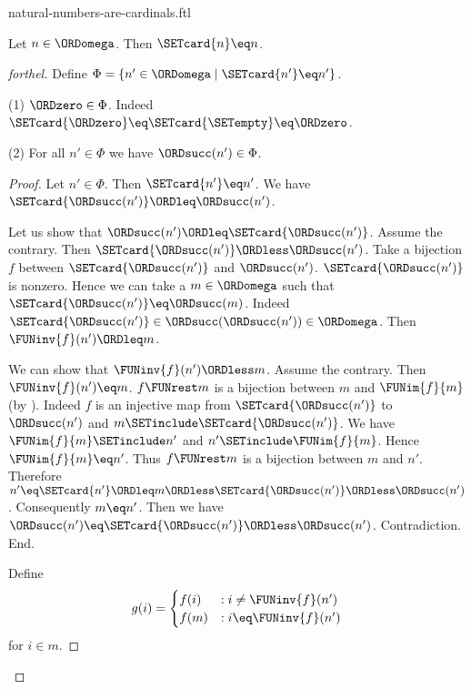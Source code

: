 \documentclass{naproche-library}
\begin{document}
\begin{smodule}[title=Natural Numbers are Cardinal Numbers]{natural-numbers-are-cardinals.ftl}

\begin{theorem}[forthel,id=SET_THEORY_07_2948332552978432]
  Let $n \in \ORDomega$.
  Then $\SETcard{n} \eq n$.
\end{theorem}
\begin{proof}[forthel]
  Define $\Phi = \{ n' \in \ORDomega \mid \SETcard{n'} \eq n' \}$.

  (1) $\ORDzero \in \Phi$.
  Indeed $\SETcard{\ORDzero} \eq \SETcard{\SETempty} \eq \ORDzero$.

  (2) For all $n' \in \Phi$ we have $\ORDsucc(n') \in \Phi$.
  \begin{proof}
    Let $n' \in \Phi$.
    Then $\SETcard{n'} \eq n'$.
    We have $\SETcard{\ORDsucc(n')} \ORDleq \ORDsucc(n')$.

    Let us show that $\ORDsucc(n') \ORDleq \SETcard{\ORDsucc(n')}$.
      Assume the contrary.
      Then $\SETcard{\ORDsucc(n')} \ORDless \ORDsucc(n')$.
      Take a bijection $f$ between $\SETcard{\ORDsucc(n')}$ and $\ORDsucc(n')$.
      $\SETcard{\ORDsucc(n')}$ is nonzero.
      Hence we can take a $m \in \ORDomega$ such that $\SETcard{\ORDsucc(n')} \eq \ORDsucc(m)$.
      Indeed $\SETcard{\ORDsucc(n')} \in \ORDsucc(\ORDsucc(n')) \in \ORDomega$.
      Then $\FUNinv{f}(n') \ORDleq m$.

      We can show that $\FUNinv{f}(n') \ORDless m$.
        Assume the contrary.
        Then $\FUNinv{f}(n') \eq m$.
        $f \FUNrest m$ is a bijection between $m$ and $\FUNim{f}{m}$ (by ).
        Indeed $f$ is an injective map from $\SETcard{\ORDsucc(n')}$ to $\ORDsucc(n')$ and
        $m \SETinclude \SETcard{\ORDsucc(n')}$.
        We have $\FUNim{f}{m} \SETinclude n'$ and $n' \SETinclude \FUNim{f}{m}$.
        Hence $\FUNim{f}{m} \eq n'$.
        Thus $f \FUNrest m$ is a bijection between $m$ and $n'$.
        Therefore $n'
          \eq \SETcard{n'}
          \ORDleq m
          \ORDless \SETcard{\ORDsucc(n')}
          \ORDless \ORDsucc(n')$.
        Consequently $m \eq n'$.
        Then we have $\ORDsucc(n') \eq \SETcard{\ORDsucc(n')} \ORDless \ORDsucc(n')$.
        Contradiction.
      End.

      Define \[ g(i) =
        \begin{cases}
          f(i)  & : i \neq \FUNinv{f}(n')
          \\
          f(m)  & : i \eq \FUNinv{f}(n')
        \end{cases} \]
      for $i \in m$.


\end{proof}
\end{proof}
\end{smodule}
\end{document}
